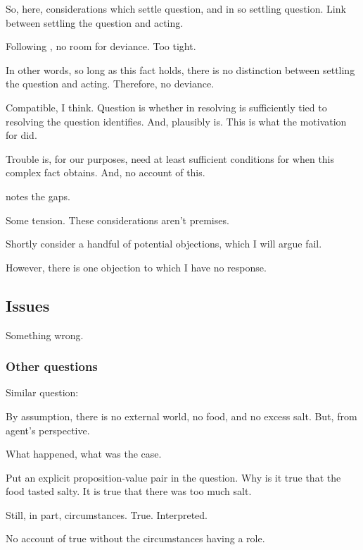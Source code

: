 \begin{note}
  So, here, considerations which settle question, and in so settling question.
  Link between settling the question and acting.

  Following \citeauthor{Hieronymi:2011aa}, no room for deviance.
  Too tight.

  In other words, so long as this fact holds, there is no distinction between settling the question and acting.
  Therefore, no deviance.

  Compatible, I think.
  Question is whether in resolving \qzS{} is sufficiently tied to resolving the question \citeauthor{Hieronymi:2011aa} identifies.
  And, plausibly is.
  This is what the motivation for \qzS{} did.

  Trouble is, for our purposes, need at least sufficient conditions for when this complex fact obtains.
  And, no account of this.

  \citeauthor{Hieronymi:2011aa} notes the gaps.

  Some tension.
  These considerations aren't premises.
\end{note}

\begin{note}
  Shortly consider a handful of potential objections, which I will argue fail.

  However, there is one objection to which I have no response.
\end{note}

\subsection{Issues}
\label{sec:issues}

\begin{note}
  Something wrong.
\end{note}

\subsubsection{Other questions}
\label{sec:other-questions}

\nocite{Smith:1988aa,Smith:1987tz}

\begin{note}
  Similar question:

  By assumption, there is no external world, no food, and no excess salt.
  But, from agent's perspective.

  What happened, what was the case.
\end{note}

\begin{note}
  Put an explicit proposition-value pair in the question.
  Why is it true that the food tasted salty.
  It is true that there was too much salt.

  Still, in part, circumstances.
  True.
  Interpreted.

  No account of true without the circumstances having a role.
\end{note}

